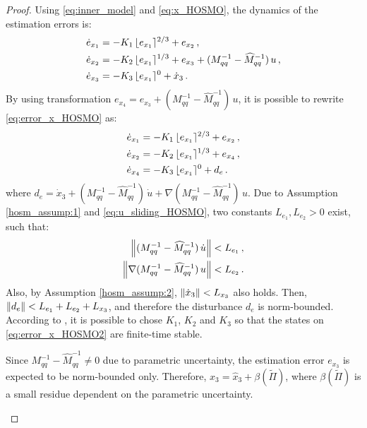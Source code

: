 \begin{proof}

%
Using \eqref{eq:inner_model} and \eqref{eq:x_HOSMO}, the dynamics of the estimation errors is:
%
\begin{align}
\dot{e}_{x_1} &= -K_1 \, \lfloor e_{x_1} \rceil^{2/3} + e_{x_2} \,, \nonumber \\
\dot{e}_{x_2} &= -K_2 \, \lfloor e_{x_1} \rceil^{1/3} + e_{x_3} + (M^{-1}_{qq} - \widehat{M}^{-1}_{qq}) \, u \,, \nonumber \\
\dot{e}_{x_3} &= -K_3 \, \lfloor e_{x_1} \rceil^{0} + \dot{x}_3 \,.
\label{eq:error_x_HOSMO}
\end{align}
%
By using transformation $e_{x_4} = e_{x_3} + (M^{-1}_{qq} - \widehat{M}^{-1}_{qq}) \, u$, it is possible to rewrite \eqref{eq:error_x_HOSMO} as:
%
%
\begin{align}
\dot{e}_{x_1} &= -K_1 \, \lfloor e_{x_1} \rceil^{2/3} + e_{x_2} \,, \nonumber \\
\dot{e}_{x_2} &= -K_2 \, \lfloor e_{x_1} \rceil^{1/3} + e_{x_4} \,, \nonumber \\
\dot{e}_{x_4} &= -K_3 \, \lfloor e_{x_1} \rceil^{0} + d_{e} \,.
\label{eq:error_x_HOSMO2}
\end{align}
%
where $d_e = \dot{x}_3 + (M^{-1}_{qq} - \widehat{M}^{-1}_{qq}) \, \dot{u} + \nabla (M^{-1}_{qq} - \widehat{M}^{-1}_{qq}) \, u$. 
%
Due to Assumption \ref{hosm_assump:1} and \eqref{eq:u_sliding_HOSMO}, two constants $L_{e_1}, L_{e_2} > 0$ exist, such that:
%
\begin{align}
\left\lVert (M^{-1}_{qq} - \widehat{M}^{-1}_{qq}) \, \dot{u} \right\rVert &< L_{e_1} \,, \\
\left\lVert \nabla (M^{-1}_{qq} - \widehat{M}^{-1}_{qq}) \, u \right\rVert &< L_{e_2} \,.
\end{align}
%
Also, by Assumption \ref{hosm_assump:2}, $\left\lVert \dot{x}_3 \right\rVert < L_{x_3}$ also holds.
Then, $\left\lVert d_e\right\rVert < L_{e_1} + L_{e_2} + L_{x_3}$, and therefore the disturbance $d_e$ is norm-bounded. According to \rev{()}, it is possible to chose $K_1$, $K_2$ and $K_3$ so that the states on \eqref{eq:error_x_HOSMO2} are finite-time stable.
%
\begin{remark}
Since $M^{-1}_{qq} - \widehat{M}^{-1}_{qq} \ne 0$ due to parametric uncertainty, the estimation error $e_{x_3}$ is expected to be norm-bounded only. Therefore, $x_3 = \widehat{x}_3 + \mathbb{\beta}(\widetilde{\Pi})$, where $\mathbb{\beta}(\widetilde{\Pi})$ is a small residue dependent on the parametric uncertainty.
\end{remark}


\end{proof}
